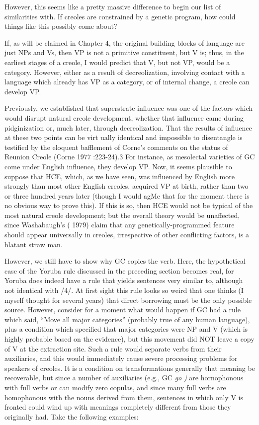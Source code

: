 However, this seems like a pretty massive difference to begin our list of similarities with. If creoles are constrained by a genetic program, how could things like this possibly come about?

If, as will be claimed in Chapter 4, the original building blocks of language are just NPs and Vs, then VP is not a primitive constituent, but V is; thus, in the earliest stages of a creole, I would predict that V, but not VP, would be a category. However, either as a result of de\-creolization, involving contact with a language which already has VP as a category, or of internal change, a creole can develop VP.

Previously, we established that superstrate influence was one of the factors which would disrupt natural creole development, whether that influence came during pidginization or, much later, through
decreolization. That the results of influence at these two points can be virt ually identical and impossible to disentangle is testified by the elo\-quent bafflement of Corne's comments on the status of Reunion Creole (Corne 1977 :223{}-24).3 For instance, as mesolectal varieties of GC come under English influence, they develop VP. Now, it seems plausible to suppose that HCE, which, as we have seen, was influenced by English more strongly than most other English creoles, acquired VP at birth, rather than two or three hundred years later (though I would agMe that for the moment there is no obvious way to prove this). If this is so, then HCE would not be typical of the most natural creole development; but the overall theory would be unaffected, since Washabaugh's ( 1979) claim that any genetically-programmed feature should appear universally in creoles, irrespective of other conflicting factors, is a blatant straw man.

However, we still have to show why GC copies the verb. Here, the hypothetical case of the Yoruba rule discussed in the preceding section becomes real, for Yoruba does indeed have a rule that yields sentences very similar to, although not identical with /4/. At first sight this rule looks so weird that one thinks (I myself thought for several years) that direct borrowing must be the only possible source. However, consider for a moment what would happen if GC had a rule which said, ``Move all major categories'' (probably true of any human lan\-guage), plus a condition which specified that major categories were NP and V (which is highly probable based on the evidence), but this movement did NOT leave a copy of V at the extraction site.
Such a rule would separate verbs from their auxiliaries, and this would immediately cause severe processing problems for speakers of creoles. It is a condition on transformations generally that meaning be recoverable, but since a number of auxiliaries (e.g., GC \textit{go} \textit{)} are hornoph\-onous with full verbs or can modify zero copulas, and since many full verbs are homophonous with the nouns derived from them, sentences in which only V is fronted could wind up with meanings completely different from those they originally had. Take the following examples:

